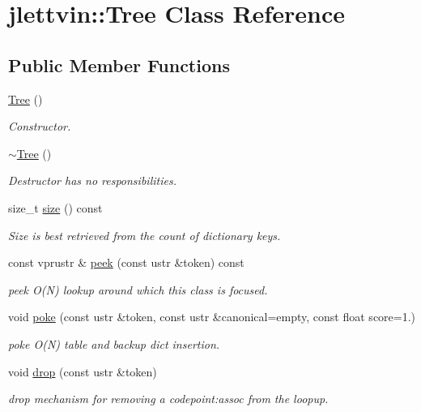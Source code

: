 \hypertarget{classjlettvin_1_1_tree}{}\section{jlettvin\+:\+:Tree Class Reference}
\label{classjlettvin_1_1_tree}
\subsection*{Public Member Functions}
\begin{DoxyCompactItemize}
\item 
\hyperlink{classjlettvin_1_1_tree_ad376a7c639d857312f5de2ef47482f68}{Tree} ()
\begin{DoxyCompactList}\small\item\em Constructor. \end{DoxyCompactList}\item 
\hyperlink{classjlettvin_1_1_tree_abdc38545cf3f588725b5d8b8075b3866}{$\sim$\+Tree} ()
\begin{DoxyCompactList}\small\item\em Destructor has no responsibilities. \end{DoxyCompactList}\item 
size\+\_\+t \hyperlink{classjlettvin_1_1_tree_a1edf6251d8a3aa6a3a40d261339b83c6}{size} () const 
\begin{DoxyCompactList}\small\item\em Size is best retrieved from the count of dictionary keys. \end{DoxyCompactList}\item 
const vprustr \& \hyperlink{classjlettvin_1_1_tree_a65746e86398aa8215481ffafdd8fa02d}{peek} (const ustr \&token) const 
\begin{DoxyCompactList}\small\item\em peek O(\+N) lookup around which this class is focused. \end{DoxyCompactList}\item 
void \hyperlink{classjlettvin_1_1_tree_a3ffabbc1a6b81df085827f3ed851f061}{poke} (const ustr \&token, const ustr \&canonical=empty, const float score=1.)
\begin{DoxyCompactList}\small\item\em poke O(\+N) table and backup dict insertion. \end{DoxyCompactList}\item 
void \hyperlink{classjlettvin_1_1_tree_af6eacfd1dc52c39d9363857ea9aa6ac9}{drop} (const ustr \&token)
\begin{DoxyCompactList}\small\item\em drop mechanism for removing a codepoint\+:assoc from the loopup. \end{DoxyCompactList}\end{DoxyCompactItemize}


